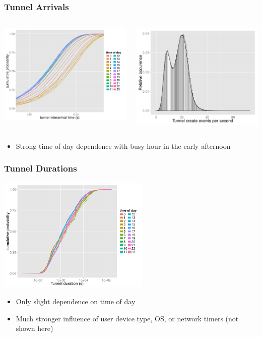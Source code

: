 \documentclass{beamer}
\begin{document}
\begin{frame}
	\frametitle{Tunnel Arrivals}
	\begin{columns}[c]
		\begin{column}{6.5cm}
				\includegraphics[width=6.5cm]{figures/R-IAT-fromflows-ecdfs-2h.pdf}
		\end{column}
		\begin{column}{6.5cm}
			\includegraphics[width=6.5cm]{figures/create_freq.pdf}
		\end{column}
	\end{columns}

	\begin{itemize}
		\item Strong time of day dependence with busy hour in the early afternoon
	\end{itemize}
\end{frame}

\begin{frame}
	\frametitle{Tunnel Durations}
	\begin{center}
		\includegraphics[height=5.5cm]{figures/R-duration-activetunnels-timeofday-ecdf.pdf}
	\end{center}

	\begin{itemize}
		\item Only slight dependence on time of day
		\item Much stronger influence of user device type, OS, or network timers (not shown here)
	\end{itemize}
\end{frame}
\end{document}
